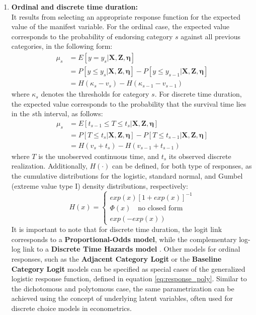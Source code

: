 \begin{enumerate}
	\item \textbf{Ordinal and discrete time duration:} \\
	It results from selecting an appropriate response function for the expected value of the manifest variable. For the ordinal case, the expected value corresponds to the probability of endorsing category $s$ against all previous categories, in the following form:
	\begin{equation} \label{eq:link_ord1}
		\begin{split}
			\mu_{s} &= E[y = y_{s} | \mathbf{X}, \mathbf{Z}, \pmb{\eta}] \\
			&= P[y \leq y_{s} | \mathbf{X}, \mathbf{Z}, \pmb{\eta}] - P[y \leq y_{s-1} | \mathbf{X}, \mathbf{Z}, \pmb{\eta}] \\
			&= H(\kappa_{s} - v_{s}) - H(\kappa_{s-1} - v_{s-1})
		\end{split}
	\end{equation}
	where $\kappa_{s}$ denotes the thresholds for category $s$. For discrete time duration, the expected value corresponds to the probability that the survival time lies in the $s$th interval, as follows:
	\begin{equation} \label{eq:link_ord2}
		\begin{split}
			\mu_{s} &= E[t_{s-1} \leq T \le t_{s} | \mathbf{X}, \mathbf{Z}, \pmb{\eta}] \\
			&= P[T \leq t_{s} | \mathbf{X}, \mathbf{Z}, \pmb{\eta}] - P[T \leq t_{s-1} | \mathbf{X}, \mathbf{Z}, \pmb{\eta}] \\
			&= H(v_{s} + t_{s}) - H(v_{s-1} + t_{s-1})
		\end{split}
	\end{equation}
	where $T$ is the unobserved continuous time, and $t_{s}$ its observed discrete realization. Additionally, $H(\cdot)$ can be defined, for both type of responses, as the cumulative distributions for the logistic, standard normal, and Gumbel (extreme value type I) density  distributions, respectively:
	\begin{equation} \label{eq:response_ord}
	H(x) = 
	\begin{cases}
		exp(x)[1 + exp(x)]^{-1} \\
		\Phi(x) \quad \text{no closed form} \\
		exp(-exp(x))
	\end{cases}
	\end{equation}
	It is important to note that for discrete time duration, the logit link corresponds to a \textbf{Proportional-Odds model}, while the complementary log-log link to a \textbf{Discrete Time Hazards model} \citep{Rabe_et_al_2001}. Other models for ordinal responses, such as the \textbf{Adjacent Category Logit} or the \textbf{Baseline Category Logit} models can be specified as special cases of the generalized logistic response function, defined in equation \ref{eq:response_poly}. Similar to the dichotomous and polytomous case, the same parametrization can be achieved using the concept of underlying latent variables, often used for discrete choice models in econometrics.
	

\end{enumerate}
